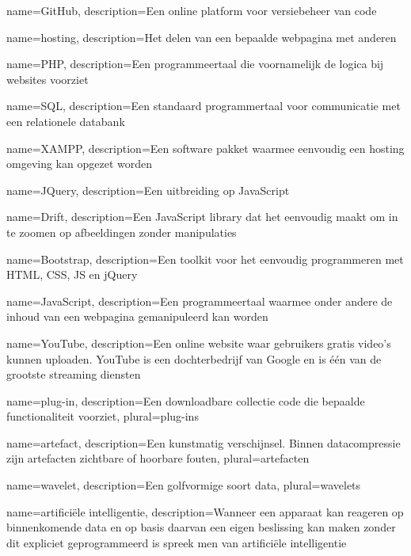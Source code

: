 {
	name={GitHub},
	description={Een online platform voor versiebeheer van code}
}

{
	name={hosting},
	description={Het delen van een bepaalde webpagina met anderen}
}

{
	name={PHP},
	description={Een programmeertaal die voornamelijk de logica bij websites voorziet}
}

{
	name={SQL},
	description={Een standaard programmertaal voor communicatie met een relationele databank}
}

{
	name={XAMPP},
	description={Een software pakket waarmee eenvoudig een hosting omgeving kan opgezet worden}
}

{
	name={JQuery},
	description={Een uitbreiding op JavaScript}
}

{
	name={Drift},
	description={Een JavaScript library dat het eenvoudig maakt om in te zoomen op afbeeldingen zonder manipulaties}
}

{
	name={Bootstrap},
	description={Een toolkit voor het eenvoudig programmeren met HTML, CSS, JS en jQuery}
}

{
	name={JavaScript},
	description={Een programmeertaal waarmee onder andere de inhoud van een webpagina gemanipuleerd kan worden}
}

{
	name={YouTube},
	description={Een online website waar gebruikers gratis video's kunnen uploaden. YouTube is een dochterbedrijf van Google en is één van de grootste streaming diensten}
}

{
	name={plug-in},
	description={Een downloadbare collectie code die bepaalde functionaliteit voorziet},
	plural={plug-ins}
}

{
	name={artefact},
	description={Een kunstmatig verschijnsel. Binnen datacompressie zijn artefacten zichtbare of hoorbare fouten},
	plural={artefacten}
}

{
	name={wavelet},
	description={Een golfvormige soort data},
	plural={wavelets}
}

{
	name={artificiële intelligentie},
	description={Wanneer een apparaat kan reageren op binnenkomende data en op basis daarvan een eigen beslissing kan maken zonder dit expliciet geprogrammeerd is spreek men van artificiële intelligentie}
}

